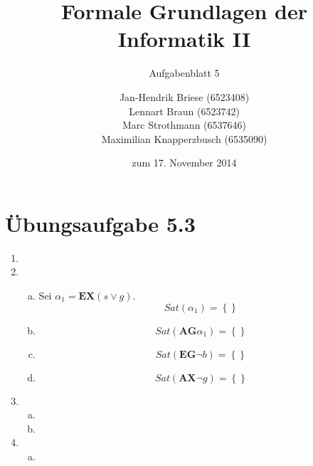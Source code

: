 \documentclass[a4paper]{scrartcl}
\title{Formale Grundlagen der Informatik II}
\subtitle{Aufgabenblatt 5}
\author{
    Jan-Hendrik Briese (6523408) \\
    Lennart Braun (6523742) \\
    Marc Strothmann (6537646) \\
    Maximilian Knapperzbusch (6535090)
}
\date{zum 17. November 2014}
\begin{document}
\maketitle

\section*{Übungsaufgabe 5.3} 
\begin{enumerate}
    \item

    \item
        \begin{enumerate}[(a)]
            \item Sei $\alpha_1 = \textbf{EX}(s \lor g)$.
                \begin{equation}
                    Sat(\alpha_1) = \left\{  \right\}
                \end{equation}

            \item
                \begin{equation}
                    Sat(\textbf{AG}\alpha_1) = \left\{  \right\}
                \end{equation}

            \item
                \begin{equation}
                    Sat(\textbf{EG} \lnot b) = \left\{  \right\}
                \end{equation}

            \item
                \begin{equation}
                    Sat(\textbf{AX} \lnot g) = \left\{  \right\}
                \end{equation}

        \end{enumerate}

    \item
        \begin{enumerate}[(a)]
            \item
                
            \item
                
        \end{enumerate}

    \item
        \begin{enumerate}[(a)]
            \item
                

\end{enumerate}
\end{enumerate}
\end{document}

